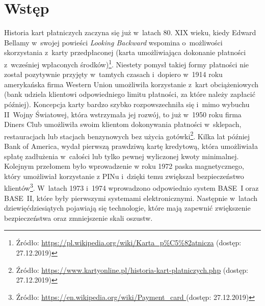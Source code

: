 \documentclass[inzynierska]{pwr_wmat_praca_dyplomowa}
\theoremstyle{plain}
\numberwithin{theorem}{chapter}
\theoremstyle{definition}
\numberwithin{theorem}{chapter}
\begin{document}
	
\newcommand{\htx}{h_{\theta}(\boldsymbol{x_i})}
\newcommand{\es}{\mathcal{S}}
\newcommand{\ef}{\mathcal{F}}
\newcommand{\ku}{\mathcal{Q}}
\newcommand{\iks}{\boldsymbol{x}}
\newcommand{\yht}[1]{y_i^{(#1)}}
\newcommand{\ytrue}{\boldsymbol{y}}


\frontmatter
\maketitle
\tableofcontents
\mainmatter



\chapter*{Wstęp}
 

Historia kart płatniczych zaczyna się już w~latach 80. XIX wieku, kiedy Edward Bellamy w~swojej powieści \textit{Looking Backward} wspomina o~możliwości skorzystania z~karty przedpłaconej (karta umożliwiająca dokonanie płatności z~wcześniej wpłaconych środków)\footnote{Źródło: \url{https://pl.wikipedia.org/wiki/Karta_p\%C5\%82atnicza} (dostęp: 27.12.2019)}. Niestety pomysł takiej formy płatności nie został pozytywnie przyjęty w~tamtych czasach i~dopiero w~1914 roku amerykańska firma Western Union umożliwiła korzystanie z~kart obciążeniowych (bank udziela klientowi odpowiedniego limitu płatności, za które należy zapłacić później). Koncepcja karty bardzo szybko rozpowszechniła się i~mimo wybuchu II~Wojny Światowej, która wstrzymała jej rozwój, to już w~1950 roku firma Diners Club umożliwiła swoim klientom dokonywania płatności w~sklepach, restauracjach lub stacjach benzynowych bez użycia gotówki\footnote{Źródło: \url{https://www.kartyonline.pl/historia-kart-platniczych.php} (dostęp: 27.12.2019)}. Kilka lat później Bank of America, wydał pierwszą prawdziwą kartę kredytową, która umożliwiała spłatę zadłużenia w~całości lub tylko pewnej wyliczonej kwoty minimalnej. Kolejnym przełomem było wprowadzenie w roku 1972 paska magnetycznego, który umożliwiał korzystanie z PINu i~dzięki temu zwiększał bezpieczeństwo klientów\footnote{Źródło: \url{https://en.wikipedia.org/wiki/Payment_card } (dostęp: 27.12.2019)}. W~latach 1973 i~1974 wprowadzono odpowiednio system BASE~I oraz BASE~II, które były pierwszymi systemami elektronicznymi. Następnie w~latach dziewięćdziesiątych pojawiają się technologie, które mają zapewnić zwiększenie bezpieczeństwa oraz zmniejszenie skali oszustw.
\end{document}
